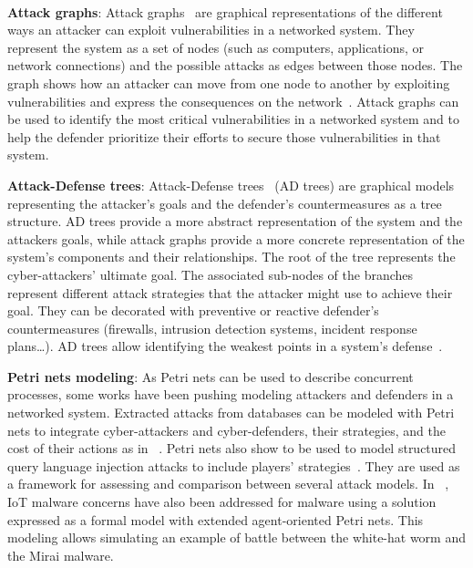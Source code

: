 \

\noindent
\textbf{Attack graphs}: \quad Attack graphs~\cite{CPhilips1998} are graphical representations of the different ways an attacker can exploit vulnerabilities in a networked system. They represent the system as a set of nodes (such as computers, applications, or network connections) and the possible attacks as edges between those nodes. The graph shows how an attacker can move from one node to another by exploiting vulnerabilities and express the consequences on the network~\cite{CPhilips1998}.
Attack graphs can be used to identify the most critical vulnerabilities in a networked system and to help the defender prioritize their efforts to secure those vulnerabilities in that system.



\noindent
\textbf{Attack-Defense trees}: \quad Attack-Defense trees~\cite{BKordy2010} (AD trees) are graphical models representing the attacker's goals and the defender's countermeasures as a tree structure. AD trees provide a more abstract representation of the system and the attackers goals, while attack graphs provide a more concrete representation of the system's components and their relationships. The root of the tree represents the cyber-attackers' ultimate goal. The associated sub-nodes of the branches represent different attack strategies that the attacker might use to achieve their goal. They can be decorated with preventive or reactive defender's countermeasures (firewalls, intrusion detection systems, incident response plans\dots).
AD trees allow identifying the weakest points in a system's defense~\cite{BKordy2010}.


\noindent
\textbf{Petri nets modeling}: \quad As Petri nets can be used to describe concurrent processes, some works have been pushing modeling attackers and defenders in a networked system.
Extracted attacks from databases can be modeled with Petri nets to integrate cyber-attackers and cyber-defenders, their strategies, and the cost of their actions as in ~\cite{MPetty2022}. Petri nets also show to be used to model structured query language injection attacks to include players' strategies~\cite{JBland2020}.
They are used as a framework for assessing and comparison between several attack models.
In ~\cite{SYamaguchi2020}, IoT malware concerns have also been addressed for  malware using a  solution expressed as a formal model with extended agent-oriented Petri nets. This modeling allows simulating an example of battle between the white-hat worm and the Mirai malware.



